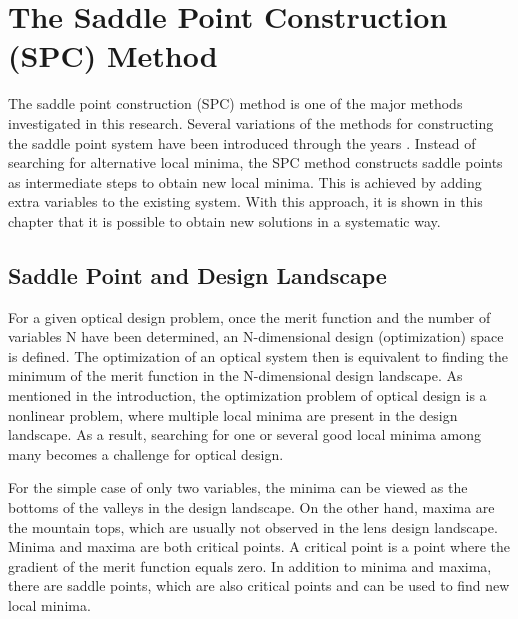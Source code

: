\chapter{The Saddle Point Construction (SPC) Method}
\label{chapter_SPC_method_reccomendation}
\graphicspath{ {./chapter-sp/figures/} }
\captionsetup[figure]{labelfont=bf}
\captionsetup{margin=1.5em}
\captionsetup[table]{labelfont=bf}





\noindent 
The saddle point construction (SPC) method is one of the major methods investigated in this research. Several variations of the methods for constructing the saddle point system have been introduced through the years \cite{BociortSPCSexplained}\cite{MVTurnhoutSPC15}\cite{HouProc2015}. Instead of searching for alternative local minima, the SPC method constructs saddle points as intermediate steps to obtain new local minima. This is achieved by adding extra variables to the existing system. With this approach, it is shown in this chapter that it is possible to obtain new solutions in a systematic way. 

\section{Saddle Point and Design Landscape}
For a given optical design problem, once the merit function and the number of variables N have been determined, an N-dimensional design (optimization) space is defined. The optimization of an optical system then is equivalent to finding the minimum of the merit function in the N-dimensional design landscape. As mentioned in the introduction, the optimization problem of optical design is a nonlinear problem, where multiple local minima are present in the design landscape. As a result, searching for one or several good local minima among many becomes a challenge for optical design. 

For the simple case of only two variables, the minima can be viewed as the bottoms of the valleys in the design landscape. On the other hand, maxima are the mountain tops, which are usually not observed in the lens design landscape. Minima and maxima are both critical points. A critical point is a point where the gradient of the merit function equals zero. In addition to minima and maxima, there are saddle points, which are also critical points and can be used to find new local minima.

